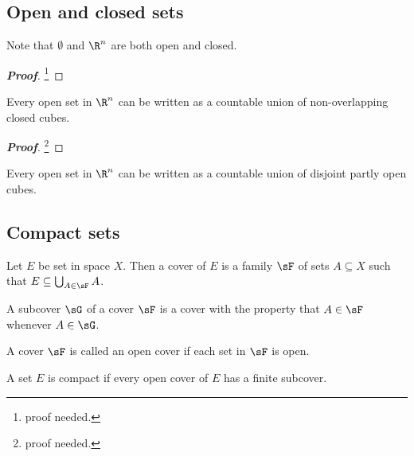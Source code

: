 \subsection{Open and closed sets}

\begin{proposition}
Note that $\emptyset$ and $\R^n$ are both open and closed.
\end{proposition}

\begin{proof}[\bf Proof]
\footnote{proof needed.}
\end{proof}

\begin{theorem}\label{thm:open_set_multi_dimensional_real_n_can_be_countable_union_of_non_overlapping_closed_cubes}
Every open set in $\R^n$ can be written as a countable union of non-overlapping closed cubes.
\end{theorem}

\begin{proof}[\bf Proof]
\footnote{proof needed.}
\end{proof}

\begin{theorem}
Every open set in $\R^n$ can be written as a countable union of disjoint partly open cubes.
\end{theorem}



\subsection{Compact sets}

\begin{definition}
Let $E$ be set in space $X$. Then a cover of $E$ is a family $\sF$ of sets $A\subseteq X$ such that $E\subseteq\bigcup_{A\in \sF} A$.
\end{definition}

\begin{definition}
A subcover $\sG$ of a cover $\sF$ is a cover with the property that $A \in \sF$ whenever $A \in \sG$.
\end{definition}

\begin{definition}
A cover $\sF$ is called an open cover if each set in $\sF$ is open.
\end{definition}

\begin{definition}
A set $E$ is compact if every open cover of $E$ has a finite subcover.
\end{definition}

